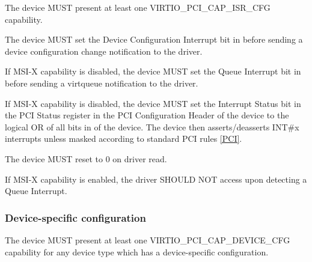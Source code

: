 
The device MUST present at least one VIRTIO_PCI_CAP_ISR_CFG capability.  

The device MUST set the Device Configuration Interrupt bit
in  before sending a device configuration
change notification to the driver.

If MSI-X capability is disabled, the device MUST set the Queue
Interrupt bit in  before sending a virtqueue
notification to the driver.

If MSI-X capability is disabled, the device MUST set the Interrupt Status
bit in the PCI Status register in the PCI Configuration Header of
the device to the logical OR of all bits in  of
the device.  The device then asserts/deasserts INT\#x interrupts unless masked
according to standard PCI rules \hyperref[intro:PCI]{[PCI]}.

The device MUST reset  to 0 on driver read.


If MSI-X capability is enabled, the driver SHOULD NOT access
 upon detecting a Queue Interrupt.

\subsubsection{Device-specific configuration}\label{sec:Virtio Transport Options / Virtio Over PCI Bus / PCI Device Layout / Device-specific configuration}

The device MUST present at least one VIRTIO_PCI_CAP_DEVICE_CFG capability for
any device type which has a device-specific configuration.


